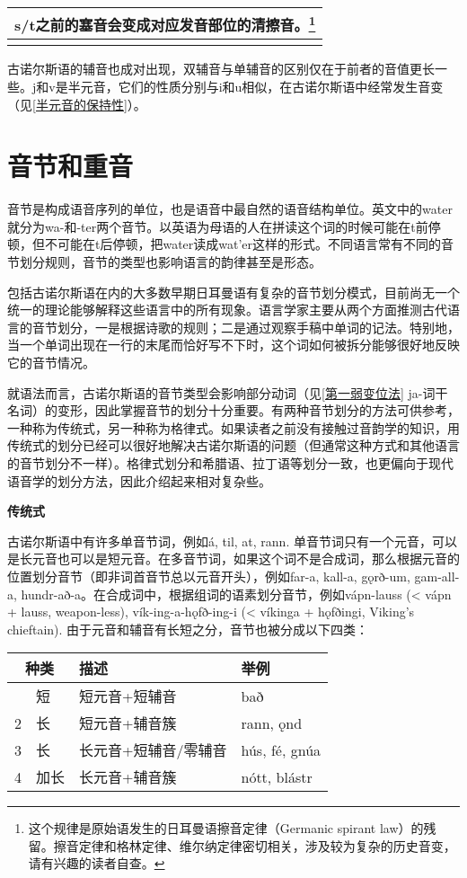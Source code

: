 \begin{longtable}{l}
  \toprule
  s/t之前的塞音会变成对应发音部位的清擦音。\footnote{这个规律是原始语发生的日耳曼语擦音定律（Germanic  spirant  law）的残留。擦音定律和格林定律、维尔纳定律密切相关，涉及较为复杂的历史音变，请有兴趣的读者自查。\textsubscript{­}} \\
  \midrule
  \endhead
  \bottomrule
  \endfoot
\end{longtable}

古诺尔斯语的辅音也成对出现，双辅音与单辅音的区别仅在于前者的音值更长一些。j和v是半元音，它们的性质分别与i和u相似，在古诺尔斯语中经常发生音变（见\ref{半元音的保持性}）。

\section{音节和重音}\label{音节和重音}

音节是构成语音序列的单位，也是语音中最自然的语音结构单位。英文中的water就分为wa-和-ter两个音节。以英语为母语的人在拼读这个词的时候可能在t前停顿，但不可能在t后停顿，把water读成wat'er这样的形式。不同语言常有不同的音节划分规则，音节的类型也影响语言的韵律甚至是形态。

包括古诺尔斯语在内的大多数早期日耳曼语有复杂的音节划分模式，目前尚无一个统一的理论能够解释这些语言中的所有现象。语言学家主要从两个方面推测古代语言的音节划分，一是根据诗歌的规则；二是通过观察手稿中单词的记法。特别地，当一个单词出现在一行的末尾而恰好写不下时，这个词如何被拆分能够很好地反映它的音节情况。

就语法而言，古诺尔斯语的音节类型会影响部分动词（见\ref{第一弱变位法}
ja-词干名词）的变形，因此掌握音节的划分十分重要。有两种音节划分的方法可供参考，一种称为传统式，另一种称为格律式。如果读者之前没有接触过音韵学的知识，用传统式的划分已经可以很好地解决古诺尔斯语的问题（但通常这种方式和其他语言的音节划分不一样）。格律式划分和希腊语、拉丁语等划分一致，也更偏向于现代语音学的划分方法，因此介绍起来相对复杂些。

\textbf{传统式}

古诺尔斯语中有许多单音节词，例如á, til, at, rann.
单音节词只有一个元音，可以是长元音也可以是短元音。在多音节词，如果这个词不是合成词，那么根据元音的位置划分音节（即非词首音节总以元音开头），例如far-a,
kall-a, gǫrð-um, gam-all-a,
hundr-að-a。在合成词中，根据组词的语素划分音节，例如vápn-lauss
(\textless{} vápn + lauss, weapon-less), vík-ing-a-hǫfð-ing-i
(\textless{} víkinga + hǫfðingi, Viking's chieftain).
由于元音和辅音有长短之分，音节也被分成以下四类：

\begin{longtable}{llll}
  \toprule
  \multicolumn{2}{c}{种类} & 描述 & 举例                                 \\
  \midrule
  \endhead
  \bottomrule
  \endfoot
  1                        & 短   & 短元音+短辅音        & bað           \\
  2                        & 长   & 短元音+辅音簇        & rann, ǫnd     \\
  3                        & 长   & 长元音+短辅音/零辅音 & hús, fé, gnúa \\
  4                        & 加长 & 长元音+辅音簇        & nótt, blástr  \\
\end{longtable}

